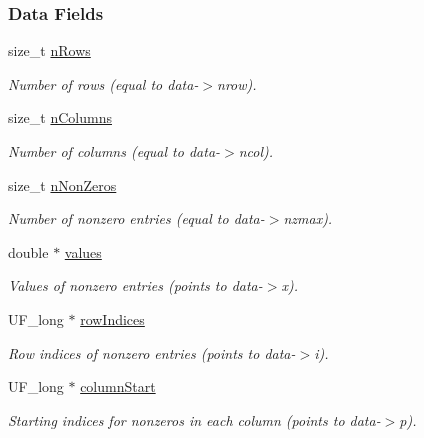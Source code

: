 \subsubsection*{Data Fields}
\begin{DoxyCompactItemize}
\item 
size\-\_\-t \hyperlink{structhm_sparse_matrix_a7fbc9f4a4303c885a43e849d118e843f}{n\-Rows}
\begin{DoxyCompactList}\small\item\em Number of rows (equal to data-\/$>$nrow). \end{DoxyCompactList}\item 
size\-\_\-t \hyperlink{structhm_sparse_matrix_a7078245a8b4311640e4e0d4b231cfedb}{n\-Columns}
\begin{DoxyCompactList}\small\item\em Number of columns (equal to data-\/$>$ncol). \end{DoxyCompactList}\item 
size\-\_\-t \hyperlink{structhm_sparse_matrix_aa7cd091d7d5f28c5324c85e4f9cc987f}{n\-Non\-Zeros}
\begin{DoxyCompactList}\small\item\em Number of nonzero entries (equal to data-\/$>$nzmax). \end{DoxyCompactList}\item 
double $\ast$ \hyperlink{structhm_sparse_matrix_a2098158062e3e63fce7d2575b324c386}{values}
\begin{DoxyCompactList}\small\item\em Values of nonzero entries (points to data-\/$>$x). \end{DoxyCompactList}\item 
U\-F\-\_\-long $\ast$ \hyperlink{structhm_sparse_matrix_aa7efdb42536c3242eb0dc426a820edb3}{row\-Indices}
\begin{DoxyCompactList}\small\item\em Row indices of nonzero entries (points to data-\/$>$i). \end{DoxyCompactList}\item 
U\-F\-\_\-long $\ast$ \hyperlink{structhm_sparse_matrix_ae774e884f91554a22ea88d1c93a9c322}{column\-Start}
\begin{DoxyCompactList}\small\item\em Starting indices for nonzeros in each column (points to data-\/$>$p). \end{DoxyCompactList}\end{DoxyCompactItemize}



